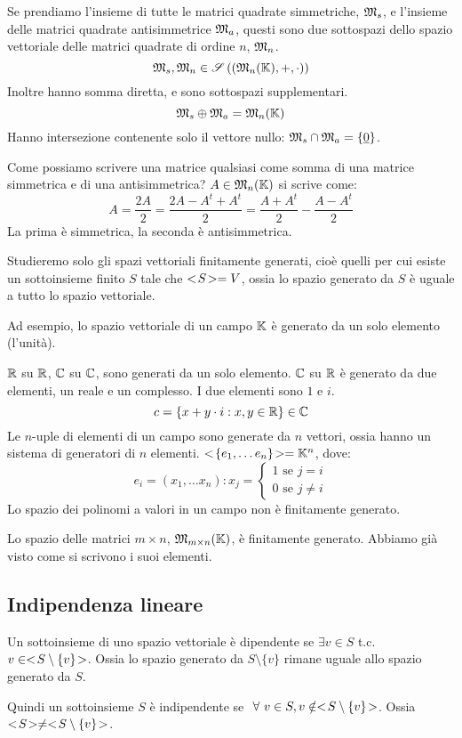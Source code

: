 Se prendiamo l'insieme di tutte le matrici quadrate simmetriche, $\mathfrak{M}_{s}$, e l'insieme delle matrici quadrate antisimmetrice $\mathfrak{M}_{a}$, questi sono due sottospazi dello spazio vettoriale delle matrici quadrate di ordine $n$, $ \mathfrak{M}_n$.
\[
\mathfrak{M}_s, \mathfrak{M}_n \in \mathscr{S} \left( (\mathfrak{M}_n (\mathbb{K}), +, \cdot) \right)
\]
Inoltre hanno somma diretta, e sono sottospazi supplementari.
\[
\mathfrak{M}_{s} \oplus \mathfrak{M}_{a} = \mathfrak{M}_n (\mathbb{K})
\]
Hanno intersezione contenente solo il vettore nullo: $\mathfrak{M}_s \cap \mathfrak{M}_a = \{ \underline{0} \}$.

Come possiamo scrivere una matrice qualsiasi come somma di una matrice simmetrica e di una antisimmetrica? $A \in \mathfrak{M}_n (\mathbb{K})$ si scrive come:
\[
A = \frac{2 A}{2} = \frac{2 A - A^t + A^t}{2} = \frac{A + A^t}{2} - \frac{A - A^t}{2}
\]
La prima \`e simmetrica, la seconda \`e antisimmetrica.

Studieremo solo gli spazi vettoriali finitamente generati, cio\`e quelli per cui esiste un sottoinsieme finito $S$ tale che $<\!{S}\!> = V$, ossia lo spazio generato da $S$ \`e uguale a tutto lo spazio vettoriale.

Ad esempio, lo spazio vettoriale di un campo $\mathbb{K}$ \`e generato da un solo elemento (l'unit\`a).

$\mathbb{R}$ su $\mathbb{R}$, $\mathbb{C}$ su $\mathbb{C}$, sono generati da un solo elemento. $\mathbb{C}$ su $\mathbb{R}$ \`e generato da due elementi, un reale e un complesso. I due elementi sono $1$ e $i$.
\[
c = \{ x + y \cdot i : x, y \in \mathbb{R} \} \in \mathbb{C}
\]
Le $n$-uple di elementi di un campo sono generate da $n$ vettori, ossia hanno un sistema di generatori di $n$ elementi. $<\!{\{e_1, \dots e_n\}}\!> = \mathbb{K}^n$, dove:
\[
e_i = (x_1, \dots x_n) : x_j =
\begin{cases}
1 \text{ se } j = i \\
0 \text{ se } j \neq i
\end{cases}
\]
Lo spazio dei polinomi a valori in un campo non \`e finitamente generato.

Lo spazio delle matrici $m \times n$, $\mathfrak{M}_{m \times n} (\mathbb{K})$, \`e finitamente generato. Abbiamo gi\`a visto come si scrivono i suoi elementi.

\subsection{Indipendenza lineare}

\begin{defn}
Un sottoinsieme di uno spazio vettoriale \`e dipendente se $\exists v \in S$ t.c. $v \in <\!{S \setminus \{v\}}\!>$. Ossia lo spazio generato da $S \setminus \{v\}$ rimane uguale allo spazio generato da $S$.

Quindi un sottoinsieme $S$ \`e indipendente se $\forall v \in S, v \notin \pow{S \setminus \{v\}}$. Ossia $<\!{S}\!> \neq <\!{S \setminus \{v\}}\!>$.
\end{defn}

